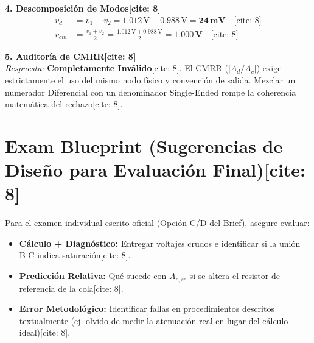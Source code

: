 \documentclass[11pt, a4paper]{article}
\begin{document}
\vspace{0.3cm}
\textbf{4. Descomposición de Modos[cite: 8]}
\begin{align*}
    v_d &= v_1 - v_2 = 1.012\,\text{V} - 0.988\,\text{V} = \mathbf{24\,\text{mV}} \quad \text{[cite: 8]} \\
    v_{cm} &= \frac{v_1 + v_2}{2} = \frac{1.012\,\text{V} + 0.988\,\text{V}}{2} = \mathbf{1.000\,\text{V}} \quad \text{[cite: 8]}
\end{align*}

\vspace{0.3cm}
\textbf{5. Auditoría de CMRR[cite: 8]} \\
\textit{Respuesta:} \textbf{Completamente Inválido}[cite: 8]. El CMRR ($|A_d / A_c|$) exige estrictamente el uso del mismo nodo físico y convención de salida. Mezclar un numerador Diferencial con un denominador Single-Ended rompe la coherencia matemática del rechazo[cite: 8].

\section*{Exam Blueprint (Sugerencias de Diseño para Evaluación Final)[cite: 8]}
Para el examen individual escrito oficial (Opción C/D del Brief), asegure evaluar:
\begin{itemize}
    \item \textbf{Cálculo + Diagnóstico:} Entregar voltajes crudos e identificar si la unión B-C indica saturación[cite: 8].
    \item \textbf{Predicción Relativa:} Qué sucede con $A_{c,se}$ si se altera el resistor de referencia de la cola[cite: 8].
    \item \textbf{Error Metodológico:} Identificar fallas en procedimientos descritos textualmente (ej. olvido de medir la atenuación real en lugar del cálculo ideal)[cite: 8].
\end{itemize}
\end{document}
